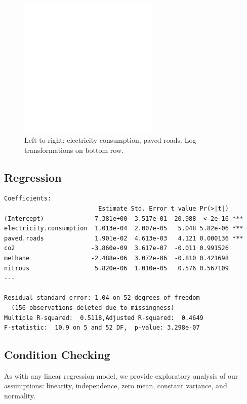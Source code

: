 \documentclass[12pt]{article}
\begin{document}
\begin{figure}[h!]
  \centering
  \includegraphics[width=0.6\textwidth]{images/climate_model_scatter_elec_roads}
  \caption{\label{climate_model_scatter_elec_roads}Left to right: electricity consumption, paved roads. Log transformations on bottom row.}
\end{figure}


\subsection{Regression}

\begin{singlespace}
\small
\begin{verbatim}
Coefficients:
                          Estimate Std. Error t value Pr(>|t|)    
(Intercept)              7.381e+00  3.517e-01  20.988  < 2e-16 ***
electricity.consumption  1.013e-04  2.007e-05   5.048 5.82e-06 ***
paved.roads              1.901e-02  4.613e-03   4.121 0.000136 ***
co2                     -3.860e-09  3.617e-07  -0.011 0.991526    
methane                 -2.488e-06  3.072e-06  -0.810 0.421698    
nitrous                  5.820e-06  1.010e-05   0.576 0.567109    
---

Residual standard error: 1.04 on 52 degrees of freedom
  (156 observations deleted due to missingness)
Multiple R-squared:  0.5118,Adjusted R-squared:  0.4649 
F-statistic:  10.9 on 5 and 52 DF,  p-value: 3.298e-07
\end{verbatim}
\end{singlespace}

\subsection{Condition Checking}
As with any linear regression model, we provide exploratory analysis of our assumptions: linearity, independence, zero mean, constant variance, and normality.
\end{document}
